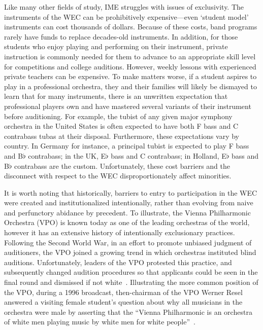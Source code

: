 \documentclass[manuscript,screen,review]{acmart}
\begin{document}
Like many other fields of study, IME struggles with issues of exclusivity.
The instruments of the WEC can be prohibitively expensive---even `student model' instruments can cost thousands of dollars. 
Because of these costs, band programs rarely have funds to replace decades-old instruments.
In addition, for those students who enjoy playing and performing on their instrument, private instruction is commonly needed for them to advance to an appropriate skill level for competitions and college auditions.
However, weekly lessons with experienced private teachers can be expensive.
To make matters worse, if a student aspires to play in a professional orchestra, they and their families will likely be dismayed to learn that for many instruments, there is an unwritten expectation that professional players own and have mastered several variants of their instrument before auditioning.
For example, the tubist of any given major symphony orchestra in the United States is often expected to have both F bass and C contrabass tubas at their disposal.
Furthermore, these expectations vary by country. In Germany for instance, a principal tubist is expected to play F bass and B$\flat$ contrabass;
in the UK, E$\flat$ bass and C contrabass;
in Holland, E$\flat$ bass and B$\flat$ contrabass are the custom.
Unfortunately, these cost barriers and the disconnect with respect to the WEC disproportionately affect minorities. 

It is worth noting that historically, barriers to entry to participation in the WEC were created and institutionalized intentionally, rather than evolving from naive and perfunctory abidance by precedent.
To illustrate, the Vienna Philharmonic Orchestra (VPO) is known today as one of the leading orchestras of the world, however it has an extensive history of intentionally exclusionary practices.  Following the Second World War, in an effort to promote unbiased judgment of auditioners, the VPO joined a growing trend in which orchestras instituted blind auditions.
Unfortunately, leaders of the VPO protested this practice, and subsequently changed audition procedures so that applicants could be seen in the final round and dismissed if not white~\cite{VPO-corollary}. Illustrating the more common position of the VPO, during a 1996 broadcast, then-chairman of the VPO Werner Resel answered a visiting female student's question about why all musicians in the orchestra were male by asserting that the ``Vienna Philharmonic is an orchestra of white men playing music by white men for white people''~\cite{VPO-corollary}.
\end{document}
